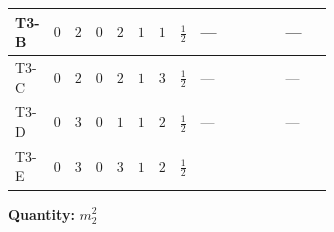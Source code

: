 \documentclass[8pt]{article}
\begin{document}
\begin{landscape}
\begin{longtable}{@{}llcccccc >{\raggedright\arraybackslash}p{0.21\linewidth} >{\raggedright\arraybackslash}p{0.21\linewidth} >{\raggedright\arraybackslash}p{0.21\linewidth}@{}}
\midrule
T3-B & $0$ & $2$ & $0$ & $2$ & $1$ & $1$ & $\frac{1}{2}$ & --- & \scriptsize\adjustbox{max width=\linewidth}{$\begin{gathered} -4 \operatorname{Tr}\!\left({M_F}\,\left({y_2}\right)^{\dagger}\,{y_2}\,\left({M_F}\right)^{\dagger}\right)\end{gathered}$} & --- \\
\midrule
T3-C & $0$ & $2$ & $0$ & $2$ & $1$ & $3$ & $\frac{1}{2}$ & --- & \scriptsize\adjustbox{max width=\linewidth}{$\begin{gathered} -6 \operatorname{Tr}\!\left({M_F}\,\left({y_2}\right)^{\dagger}\,{y_2}\,\left({M_F}\right)^{\dagger}\right)\end{gathered}$} & --- \\
\midrule
T3-D & $0$ & $3$ & $0$ & $1$ & $1$ & $2$ & $\frac{1}{2}$ & --- & \scriptsize\adjustbox{max width=\linewidth}{$\begin{gathered} -8 \operatorname{Tr}\!\left({M_F}\,\left({y_2}\right)^{\dagger}\,{y_2}\,\left({M_F}\right)^{\dagger}\right)\end{gathered}$} & --- \\
\midrule
T3-E & $0$ & $3$ & $0$ & $3$ & $1$ & $2$ & $\frac{1}{2}$ & \scriptsize\adjustbox{max width=\linewidth}{$\begin{gathered} {m_2^2} (2 T_{\nu}^{(2)}+8 {\lambda_{S_2}^{(1)}}+4 {\lambda_{S_2}^{(A)}})\end{gathered}$} & \scriptsize\adjustbox{max width=\linewidth}{$\begin{gathered} -4 \operatorname{Tr}\!\left({M_F}\,\left({y_2}\right)^{\dagger}\,{y_2}\,\left({M_F}\right)^{\dagger}\right)\end{gathered}$} & \scriptsize\adjustbox{max width=\linewidth}{$\begin{gathered} -12 {g_2}^2 {m_2^2}\end{gathered}$} \\
\midrule
\bottomrule
\end{longtable}
\clearpage
\noindent\textbf{Quantity: }$m_2^2$\par\smallskip

\end{landscape}
\end{document}
